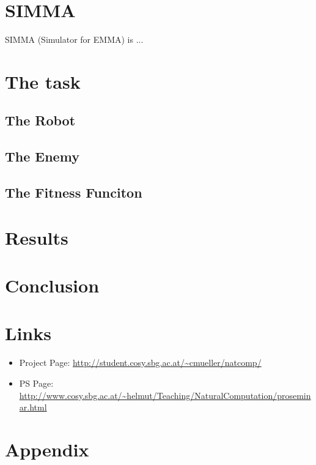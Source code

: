 \documentclass[12pt,fleqn,a4paper]{article}
\begin{document}
\section{SIMMA}
SIMMA (Simulator for EMMA) is ...

\section{The task}

\subsection{The Robot}

\subsection{The Enemy}

\subsection{The Fitness Funciton}

\section{Results}

\section{Conclusion}

\newpage



\section{Links}

\begin{itemize}
 \item Project Page: \url{http://student.cosy.sbg.ac.at/~cmueller/natcomp/}
 \item PS Page: \url{http://www.cosy.sbg.ac.at/~helmut/Teaching/NaturalComputation/proseminar.html}
\end{itemize}




\section{Appendix}
\end{document}
